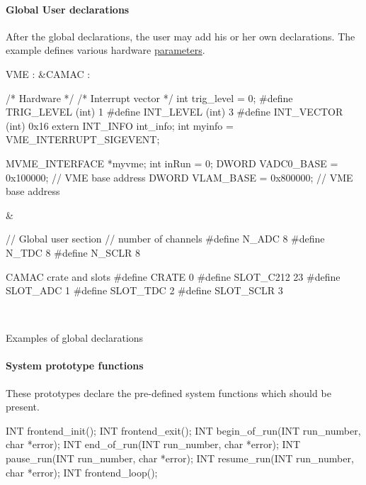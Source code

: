 \par
 \hypertarget{FE_code_sections_FE_global_user}{}\paragraph{Global User declarations}\label{FE_code_sections_FE_global_user}
After the global declarations, the user may add his or her own declarations. The example defines various hardware \hyperlink{structparameters}{parameters}. \begin{table}[h]\begin{TabularC}{2}
\hline
VME :  &CAMAC :  \\

\begin{DoxyCode}
/* Hardware */
/* Interrupt vector */
int trig_level =  0;
#define TRIG_LEVEL  (int) 1
#define INT_LEVEL   (int) 3
#define INT_VECTOR  (int) 0x16
extern INT_INFO int_info;
int myinfo = VME_INTERRUPT_SIGEVENT;

MVME_INTERFACE *myvme;
int  inRun = 0;
DWORD VADC0_BASE = 0x100000; // VME base address
DWORD VLAM_BASE  = 0x800000; // VME base address
\end{DoxyCode}
  &
\begin{DoxyCode}
    // Global user section
    // number of channels
    #define N_ADC  8  
    #define N_TDC  8 
    #define N_SCLR 8

    CAMAC crate and slots
    #define CRATE      0
    #define SLOT_C212 23
    #define SLOT_ADC   1
    #define SLOT_TDC   2
    #define SLOT_SCLR  3
\end{DoxyCode}
 \\
\end{TabularC}
\centering
\caption{Examples of global declarations }
\end{table}
\par


\par
 \hypertarget{FE_code_sections_FE_system_prototypes}{}\paragraph{System prototype functions}\label{FE_code_sections_FE_system_prototypes}
These prototypes declare the pre-\/defined system functions which should be present. 
\begin{DoxyCode}
INT frontend_init();
INT frontend_exit();
INT begin_of_run(INT run_number, char *error);
INT end_of_run(INT run_number, char *error);
INT pause_run(INT run_number, char *error);
INT resume_run(INT run_number, char *error);
INT frontend_loop();
\end{DoxyCode}
 \par


